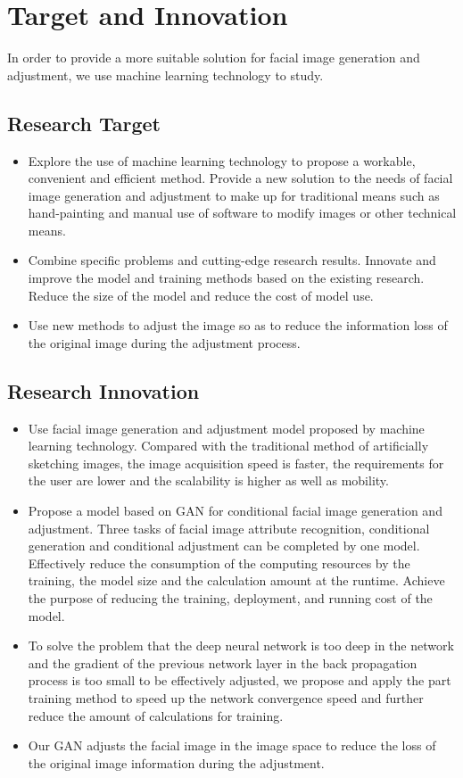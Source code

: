 \section{Target and Innovation}

In order to provide a more suitable solution for facial image generation and adjustment,
    we use machine learning technology to study.

\subsection{Research Target}
\begin{itemize}
\item Explore the use of machine learning technology to propose a workable, convenient and efficient method.
    Provide a new solution to the needs of facial image generation and adjustment to make up for traditional means such as hand-painting and manual use of software to modify images or other technical means.
\item Combine specific problems and cutting-edge research results.
    Innovate and improve the model and training methods based on the existing research.
    Reduce the size of the model and reduce the cost of model use.
\item Use new methods to adjust the image so as to reduce the information loss of the original image during the adjustment process.
\end{itemize}
\subsection{Research Innovation}
\begin{itemize}
\item Use facial image generation and adjustment model proposed by machine learning technology.
    Compared with the traditional method of artificially sketching images, the image acquisition speed is faster, the requirements for the user are lower
    and the scalability is higher as well as mobility.
\item Propose a model based on GAN for conditional facial image generation and adjustment.
    Three tasks of facial image attribute recognition,
    conditional generation and conditional adjustment can be completed by one model.
    Effectively reduce the consumption of the computing resources by the training,
    the model size and the calculation amount at the runtime.
    Achieve the purpose of reducing the training, deployment, and running cost of the model.
\item To solve the problem that the deep neural network is too deep in the network and the gradient of the previous network layer in the back propagation process is too small to be effectively adjusted,
    we propose and apply the part training method to speed up the network convergence speed and further reduce the amount of calculations for training.

\item Our GAN adjusts the facial image in the image space to reduce the loss of the original image information during the adjustment.
\end{itemize}